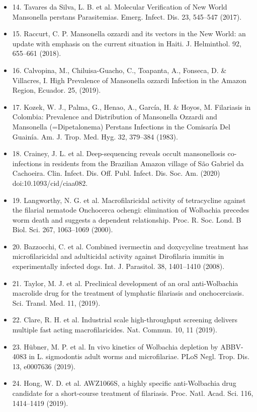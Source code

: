 \documentclass[10pt, a4paper, twocolumn]{article} %
\begin{document}
\begin{itemize}
\item 14.	Tavares da Silva, L. B. et al. Molecular Verification of New World Mansonella perstans Parasitemias. Emerg. Infect. Dis. 23, 545–547 (2017).
\item 15.	Raccurt, C. P. Mansonella ozzardi and its vectors in the New World: an update with emphasis on the current situation in Haiti. J. Helminthol. 92, 655–661 (2018).
\item 16.	Calvopina, M., Chiluisa-Guacho, C., Toapanta, A., Fonseca, D. \& Villacres, I. High Prevalence of Mansonella ozzardi Infection in the Amazon Region, Ecuador. 25, (2019).
\item 17.	Kozek, W. J., Palma, G., Henao, A., García, H. \& Hoyos, M. Filariasis in Colombia: Prevalence and Distribution of Mansonella Ozzardi and Mansonella (=Dipetalonema) Perstans Infections in the Comisaría Del Guainía. Am. J. Trop. Med. Hyg. 32, 379–384 (1983).
\item 18.	Crainey, J. L. et al. Deep-sequencing reveals occult mansonellosis co-infections in residents from the Brazilian Amazon village of São Gabriel da Cachoeira. Clin. Infect. Dis. Off. Publ. Infect. Dis. Soc. Am. (2020) doi:10.1093/cid/ciaa082.
\item 19.	Langworthy, N. G. et al. Macrofilaricidal activity of tetracycline against the filarial nematode Onchocerca ochengi: elimination of Wolbachia precedes worm death and suggests a dependent relationship. Proc. R. Soc. Lond. B Biol. Sci. 267, 1063–1069 (2000).
\item 20.	Bazzocchi, C. et al. Combined ivermectin and doxycycline treatment has microfilaricidal and adulticidal activity against Dirofilaria immitis in experimentally infected dogs. Int. J. Parasitol. 38, 1401–1410 (2008).
\item 21.	Taylor, M. J. et al. Preclinical development of an oral anti-Wolbachia macrolide drug for the treatment of lymphatic filariasis and onchocerciasis. Sci. Transl. Med. 11, (2019).
\item 22.	Clare, R. H. et al. Industrial scale high-throughput screening delivers multiple fast acting macrofilaricides. Nat. Commun. 10, 11 (2019).
\item 23.	Hübner, M. P. et al. In vivo kinetics of Wolbachia depletion by ABBV-4083 in L. sigmodontis adult worms and microfilariae. PLoS Negl. Trop. Dis. 13, e0007636 (2019).
\item 24.	Hong, W. D. et al. AWZ1066S, a highly specific anti-Wolbachia drug candidate for a short-course treatment of filariasis. Proc. Natl. Acad. Sci. 116, 1414–1419 (2019).

\end{itemize}
\end{document}

